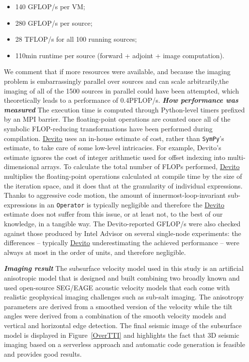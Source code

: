 \documentclass[10pt, conference]{IEEEtran}
\newcommand{\devito}{\href{https://github.com/devitocodes/devito}{Devito} }
\begin{document}
\begin{itemize}
\itemsep1pt\parskip0pt
\item
  140 GFLOP/s per VM;
\item
  280 GFLOP/s per source;
\item
  28 TFLOP/s for all 100 running sources;
\item
  110min runtime per source (forward + adjoint + image computation).
\end{itemize}

We comment that if more resources were available, and because the imaging
problem is embarrassingly parallel over sources and can scale arbitrarily,the
imaging of all of the 1500 sources in parallel could have been attempted, which
theoretically leads to a performance of 0.4PFLOP/s.
\vskip 0.1in
\noindent
\textbf{\emph{How performance was measured}}
\vskip 0.1in
The execution time is computed through Python-level timers prefixed by an
MPI barrier. The floating-point operations are counted once all of the
symbolic FLOP-reducing transformations have been performed during
compilation.  \devito uses an in-house estimate of cost, rather than
\texttt{SymPy}'s estimate, to take care of some low-level intricacies. For
example, Devito's estimate ignores the cost of integer arithmetic used for
offset indexing into multi-dimensional arrays. To calculate the total
number of FLOPs performed, \devito multiplies the floating-point operations
calculated at compile time by the size of the iteration space, and it does
that at the granularity of individual expressions.  Thanks to aggressive
code motion, the amount of innermost-loop-invariant sub-expressions in an
\texttt{Operator} is typically negligible and therefore the \devito estimate
does not suffer from this issue, or at least not, to the best of our
knowledge, in a tangible way. The Devito-reported GFLOP/s were also
checked against those produced by Intel Advisor on several single-node
experiments: the differences -- typically \devito underestimating the
achieved performance -- were always at most in the order of units, and
therefore negligible.

\vskip 0.1in
\noindent
\textbf{\emph{Imaging result}}
\vskip 0.1in
The subsurface velocity model used in this study is an artificial anisotropic
model that is designed and built combining two broadly known and used
open-source SEG/EAGE acoustic velocity models that each come with realistic
geophysical imaging challenges such as sub-salt imaging. The anisotropy
parameters are derived from a smoothed version of the velocity while the tilt
angles were derived from a combination of the smooth velocity models and
vertical and horizontal edge detection. The final seismic image of the
subsurface model is displayed in Figure~\ref{OverTTI} and highlights the fact
that 3D seismic imaging based on a serverless approach and automatic code
generation is feasible and provides good results.
\end{document}
